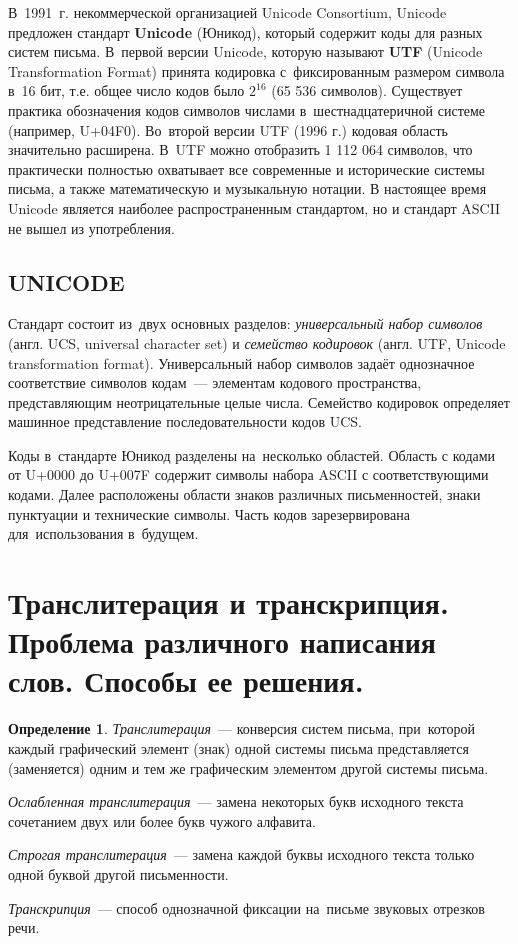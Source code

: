 \documentclass[12pt]{article}
\theoremstyle{definition}
\newtheorem*{defn}{Определение}
\theoremstyle{remark}
\numberwithin{equation}{section}
\begin{document}
В~1991~г. некоммерческой организацией Unicode Consortium, Unicode предложен стандарт 
\textbf{Unicode} (Юникод), который содержит коды для разных систем письма.
В~первой версии Unicode, которую называют \textbf{UTF} (Unicode 
Transformation Format) принята кодировка с~фиксированным размером символа в~16 бит, 
т.е. общее число кодов было $2^{16}$ (65 536 символов). Существует практика 
обозначения кодов символов числами в~шестнадцатеричной системе (например, U+04F0).
Во~второй версии UTF (1996 г.) кодовая область значительно расширена. 
В~UTF можно отобразить 1 112 064 символов, что практически полностью 
охватывает все современные и исторические системы письма, а также математическую 
и музыкальную нотации. В настоящее время Unicode является наиболее распространенным 
стандартом, но и стандарт ASCII не вышел из употребления.

\subsection{UNICODE}
Стандарт состоит из~двух основных разделов: \textsl{универсальный набор символов} 
(англ. UCS, universal character set) и \textsl{семейство кодировок} (англ. UTF, 
Unicode transformation format). Универсальный набор символов задаёт однозначное 
соответствие символов кодам~--- элементам кодового пространства, представляющим 
неотрицательные целые числа. Семейство кодировок определяет машинное представление 
последовательности кодов UCS.

Коды в~стандарте Юникод разделены на~несколько областей. Область с кодами от 
U+0000 до U+007F содержит символы набора ASCII с соответствующими кодами. 
Далее расположены области знаков различных письменностей, знаки пунктуации и 
технические символы. Часть кодов зарезервирована для~использования в~будущем.

\section{Транслитерация и транскрипция. Проблема различного написания слов. 
Способы ее решения.}
\begin{defn}
\textsl{Транслитерация}~--- конверсия систем письма, при~которой каждый 
графический элемент (знак) одной системы письма представляется (заменяется) 
одним и тем же графическим элементом другой системы письма.

\textsl{Ослабленная транслитерация}~--- замена некоторых букв исходного текста 
сочетанием двух или более букв чужого алфавита.

\textsl{Строгая транслитерация}~--- замена каждой буквы исходного текста 
только одной буквой другой письменности.

\textsl{Транскрипция}~--- способ однозначной фиксации на~письме звуковых 
отрезков речи.
\end{defn}
\end{document}
